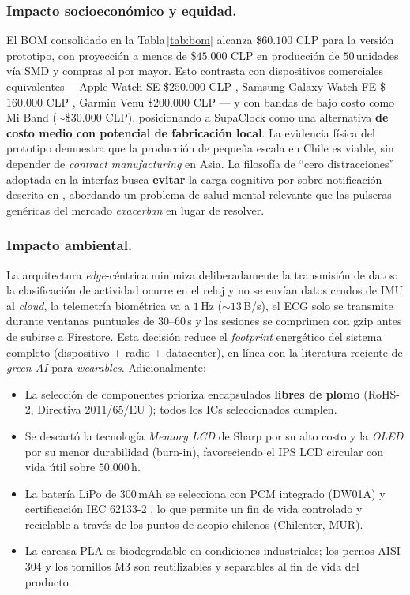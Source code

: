 \documentclass[letterpaper,11pt]{article}
\newcommand{\rtabla}[1]{Tabla\,\ref{#1}}
\begin{document}
\subsubsection*{Impacto socioecon\'omico y equidad.} El BOM consolidado en la \rtabla{tab:bom} alcanza \$$60.100$ CLP para la versi\'on prototipo, con proyecci\'on a menos de \$$45.000$ CLP en producci\'on de $50$\,unidades v\'ia SMD y compras al por mayor. Esto contrasta con dispositivos comerciales equivalentes ---Apple Watch SE \$$250.000$ CLP \cite{apple_watch_compare}, Samsung Galaxy Watch FE \$$160.000$ CLP \cite{galaxy_watch4}, Garmin Venu \$$200.000$ CLP \cite{garmin_venu}--- y con bandas de bajo costo como Mi Band ($\sim$\$$30.000$ CLP), posicionando a SupaClock como una alternativa \textbf{de costo medio con potencial de fabricaci\'on local}. La evidencia f\'isica del prototipo demuestra que la producci\'on de peque\~na escala en Chile es viable, sin depender de \textit{contract manufacturing} en Asia. La filosof\'ia de ``cero distracciones'' adoptada en la interfaz busca \textbf{evitar} la carga cognitiva por sobre-notificaci\'on descrita en \cite{Kushlev2016,Pielot2014}, abordando un problema de salud mental relevante que las pulseras gen\'ericas del mercado \textit{exacerban} en lugar de resolver.

\subsubsection*{Impacto ambiental.} La arquitectura \textit{edge}-c\'entrica minimiza deliberadamente la transmisi\'on de datos: la clasificaci\'on de actividad ocurre en el reloj y no se envían datos crudos de IMU al \textit{cloud}, la telemetr\'ia biom\'etrica va a $1$\,Hz ($\sim 13$\,B/s), el ECG solo se transmite durante ventanas puntuales de $30$--$60$\,s y las sesiones se comprimen con gzip antes de subirse a Firestore. Esta decisi\'on reduce el \textit{footprint} energ\'etico del sistema completo (dispositivo + radio + datacenter), en l\'inea con la literatura reciente de \textit{green AI} para \textit{wearables}. Adicionalmente:
\begin{itemize}
    \item La selecci\'on de componentes prioriza encapsulados \textbf{libres de plomo} (RoHS-2, Directiva 2011/65/EU \cite{rohs}); todos los ICs seleccionados cumplen.
    \item Se descart\'o la tecnolog\'ia \textit{Memory LCD} de Sharp \cite{sharpmem_ds} por su alto costo y la \textit{OLED} por su menor durabilidad (burn-in), favoreciendo el IPS LCD circular con vida \'util sobre $50.000$\,h.
    \item La bater\'ia LiPo de $300$\,mAh se selecciona con PCM integrado (DW01A) y certificaci\'on IEC 62133-2 \cite{en62133}, lo que permite un fin de vida controlado y reciclable a trav\'es de los puntos de acopio chilenos (Chilenter, MUR).
    \item La carcasa PLA es biodegradable en condiciones industriales; los pernos AISI 304 y los tornillos M3 son reutilizables y separables al fin de vida del producto.
\end{itemize}
\end{document}
